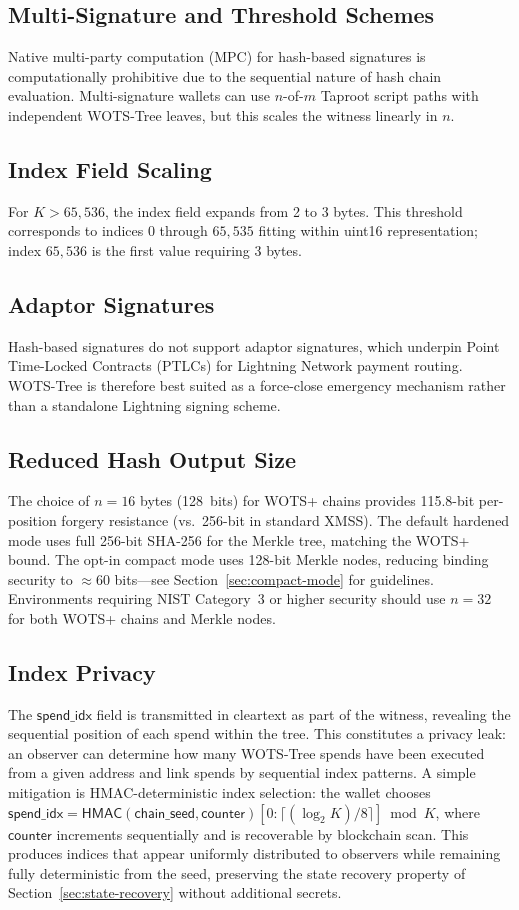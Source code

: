 \documentclass[11pt,a4paper]{article}
\theoremstyle{definition}
\begin{document}
\subsection{Multi-Signature and Threshold Schemes}
Native multi-party computation (MPC) for hash-based signatures is computationally prohibitive due to the sequential nature of hash chain evaluation. Multi-signature wallets can use $n$-of-$m$ Taproot script paths with independent WOTS-Tree leaves, but this scales the witness linearly in $n$.

\subsection{Index Field Scaling}
For $K > 65{,}536$, the index field expands from 2 to 3 bytes. This threshold corresponds to indices $0$ through $65{,}535$ fitting within uint16 representation; index $65{,}536$ is the first value requiring 3 bytes.

\subsection{Adaptor Signatures}
Hash-based signatures do not support adaptor signatures, which underpin Point Time-Locked Contracts (PTLCs) for Lightning Network payment routing. WOTS-Tree is therefore best suited as a force-close emergency mechanism rather than a standalone Lightning signing scheme.

\subsection{Reduced Hash Output Size}
The choice of $n = 16$ bytes (128~bits) for WOTS+ chains provides 115.8-bit per-position forgery resistance (vs.\ 256-bit in standard XMSS). The default hardened mode uses full 256-bit SHA-256 for the Merkle tree, matching the WOTS+ bound. The opt-in compact mode uses 128-bit Merkle nodes, reducing binding security to $\approx 60$ bits---see Section~\ref{sec:compact-mode} for guidelines. Environments requiring NIST Category~3 or higher security should use $n = 32$ for both WOTS+ chains and Merkle nodes.

\subsection{Index Privacy}
The $\mathsf{spend\_idx}$ field is transmitted in cleartext as part of the witness, revealing the sequential position of each spend within the tree. This constitutes a privacy leak: an observer can determine how many WOTS-Tree spends have been executed from a given address and link spends by sequential index patterns. A simple mitigation is HMAC-deterministic index selection: the wallet chooses $\mathsf{spend\_idx} = \mathsf{HMAC}(\mathsf{chain\_seed}, \mathsf{counter})[0{:}\lceil(\log_2 K)/8\rceil] \bmod K$, where $\mathsf{counter}$ increments sequentially and is recoverable by blockchain scan. This produces indices that appear uniformly distributed to observers while remaining fully deterministic from the seed, preserving the state recovery property of Section~\ref{sec:state-recovery} without additional secrets.
\end{document}
